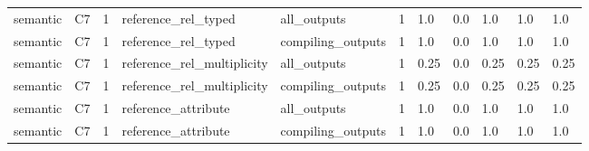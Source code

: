 \begin{tabular}{lllllllllll}
semantic & C7 & 1 & reference\_rel\_typed & all\_outputs & 1 & 1.0 & 0.0 & 1.0 & 1.0 & 1.0 \\
semantic & C7 & 1 & reference\_rel\_typed & compiling\_outputs & 1 & 1.0 & 0.0 & 1.0 & 1.0 & 1.0 \\
semantic & C7 & 1 & reference\_rel\_multiplicity & all\_outputs & 1 & 0.25 & 0.0 & 0.25 & 0.25 & 0.25 \\
semantic & C7 & 1 & reference\_rel\_multiplicity & compiling\_outputs & 1 & 0.25 & 0.0 & 0.25 & 0.25 & 0.25 \\
semantic & C7 & 1 & reference\_attribute & all\_outputs & 1 & 1.0 & 0.0 & 1.0 & 1.0 & 1.0 \\
semantic & C7 & 1 & reference\_attribute & compiling\_outputs & 1 & 1.0 & 0.0 & 1.0 & 1.0 & 1.0 \\
\end{tabular}
